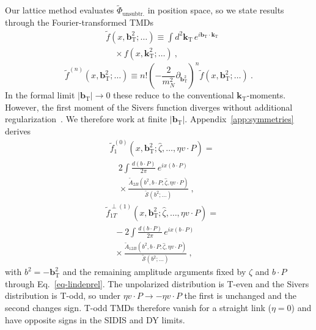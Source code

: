 \documentclass[aps,prd,twocolumn,amsmath,amssymb,floatfix]{revtex4-2}
\newcommand{\tAmp}{\widetilde{A}}
\newcommand{\vect}[1]{\ensuremath{\boldsymbol{#1}}}
\newcommand{\vprp}[1]{\vect{#1}_{\mathrm T}}
\newcommand{\tcdot}{{\cdot}}
\newcommand{\bvec}{b}
\newcommand{\kei}{k}
\newcommand{\mN}{m_N}
\newcommand{\zetahat}{{\hat \zeta}}
\newcommand{\unsub}{\text{unsubtr.}}
\begin{document}
Our lattice method evaluates $\widetilde\Phi_\unsub$ in position space, so we state results through the Fourier-transformed TMDs~\cite{Boer:2011xd}
\begin{align}
	&\tilde f(x, \vprp{\bvec}^2;\ldots) \equiv \int d^2 \vprp{\kei}\, e^{i \vprp{\bvec} \cdot \vprp{\kei}} \nonumber\\
	&\quad \times f(x, \vprp{\kei}^2;\ldots)\ ,
	\label{eq-FTMD}
\end{align}
\begin{equation}
	\tilde f^{(n)}(x, \vprp{\bvec}^2;\ldots ) \equiv n!\left( -\frac{2}{\mN^2}\partial_{\vprp{\bvec}^2} \right)^n \tilde f(x, \vprp{\bvec}^2;\ldots )\ . \label{eq-dFTMD}
\end{equation}
In the formal limit $|\vprp{\bvec}|\to0$ these reduce to the conventional $\vprp{\kei}$-moments. However, the first moment of the Sivers function diverges without additional regularization~\cite{Bacchetta:2008xw}. We therefore work at finite $|\vprp{\bvec}|$. Appendix~\ref{app:symmetries} derives
\begin{align}
	&\tilde f_1^{(0)}(x, \vprp{\bvec}^2;\zetahat,\ldots,\eta v \tcdot P) = \nonumber\\
	&\quad 2 \int \frac{d(\bvec \tcdot P)}{2\pi}\, e^{ix(\bvec \tcdot P)} \nonumber\\
	&\quad \times \frac{\tAmp_{2B}(\bvec^2,\bvec \tcdot P;\zetahat,\eta v\tcdot P)}{\widetilde{\mathcal{S}}(\bvec^2;\ldots)}\ ,
	\label{eq-xintderfttmds1}
\end{align}
\begin{align}
	&\tilde f_{1T}^{\perp(1)}(x, \vprp{\bvec}^2;\zetahat,\ldots,\eta v \tcdot P) = \nonumber\\
	&\quad -2 \int \frac{d(\bvec \tcdot P)}{2\pi}\, e^{ix(\bvec \tcdot P)} \nonumber\\
	&\quad \times \frac{\tAmp_{12B}(\bvec^2,\bvec \tcdot P;\zetahat,\eta v\tcdot P)}{\widetilde{\mathcal{S}}(\bvec^2;\ldots)}\ ,
	\label{eq-xintderfttmds2}
\end{align}
with $\bvec^2=-\vprp{\bvec}^2$ and the remaining amplitude arguments fixed by $\zetahat$ and $\bvec\tcdot P$ through Eq.~\eqref{eq-lindeprel}. The unpolarized distribution is T-even and the Sivers distribution is T-odd, so under $\eta v\tcdot P\to-\eta v\tcdot P$ the first is unchanged and the second changes sign. T-odd TMDs therefore vanish for a straight link ($\eta=0$) and have opposite signs in the SIDIS and DY limits.
\end{document}

